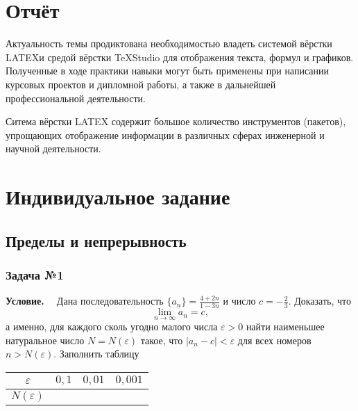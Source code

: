 \documentclass[12pt]{article}
\begin{document}
	\newpage
	\section{Отчёт}
	Актуальность темы продиктована необходимостью владеть системой вёрстки LATEXи средой вёрстки TeXStudio для отображения текста, формул и графиков. Полученные в ходе практики навыки могут быть применены при написании курсовых проектов и дипломной работы, а также в дальнейшей профессиональной деятельности.
	
	Ситема вёрстки LATEX содержит большое количество инструментов (пакетов), упрощающих отображение информации в различных сферах инженерной и научной деятельности.
	
	\newpage
	\section{Индивидуальное задание}

	\subsection{Пределы и непрерывность}
	
	\subsubsection*{\center Задача №1}
	{\bf Условие. ~}
	Дана последовательность $ \{a_n\} = \frac {4 + 2 n}{1 - 3 n}$ и число $c = -\frac{2}{3}$. Доказать, что $$ \lim\limits_{n\rightarrow\infty} a_n = c,$$ а именно, для каждого сколь угодно малого числа $ \varepsilon > 0 $ найти наименьшее натуральное число $ N = N ( \varepsilon ) $ такое, что $ | a_n - c | < \varepsilon $ для всех номеров $ n> N ( \varepsilon ) $.
		Заполнить таблицу
	
	\begin{table}[h!]
	\begin{center}
		\begin{tabular}{| c | c | c | c |}
		\hline
		$ \varepsilon $ & $ 0 {,} 1 $ & $ 0 {,} 01 $ & $ 0 {,} 001 $ \\  \hline
		$ N ( \varepsilon ) $ & & & \\
		\hline
		\end{tabular}	
	\end{center}
	\end{table}
\end{document}
